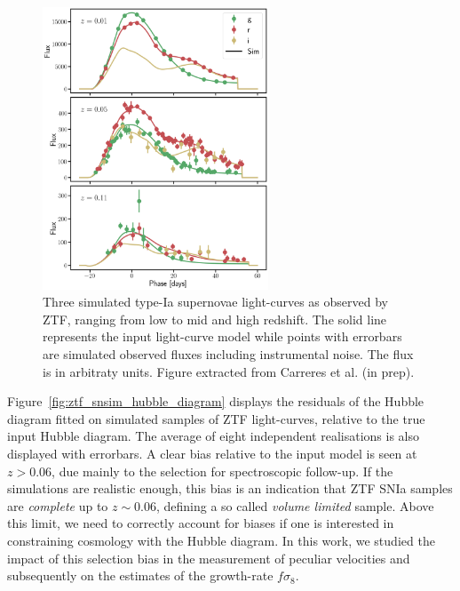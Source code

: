 \begin{figure}
    \centering
    \includegraphics[width=0.6\textwidth]{fig/velocities/snsim_lightcurves.png}
    \caption{Three simulated type-Ia supernovae light-curves as observed by ZTF, ranging from low to mid and high redshift. 
    The solid line represents the input light-curve model while points with errorbars are simulated observed fluxes 
    including instrumental noise. The flux is in arbitraty units. Figure extracted from Carreres et al. (in prep). }
    \label{fig:ztf_snsim_lightcurves}
\end{figure}

Figure~\ref{fig:ztf_snsim_hubble_diagram} displays the residuals of the Hubble diagram 
fitted on simulated samples of ZTF light-curves, relative to the true input Hubble diagram. 
The average of eight independent realisations is also displayed with errorbars. 
A clear bias relative to the input model is seen at $z > 0.06$, 
due mainly to the selection for spectroscopic follow-up. 
If the simulations are realistic enough, this bias is an indication that ZTF SNIa samples 
are \emph{complete} up to $z \sim 0.06$, defining a so called \emph{volume limited} sample. 
Above this limit, we need to correctly 
account for biases if one is interested in constraining cosmology with the Hubble diagram. 
In this work, we studied the impact of this selection bias in the measurement of peculiar 
velocities and subsequently on the estimates of the growth-rate $f\sigma_8$.  

